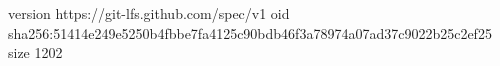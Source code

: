 version https://git-lfs.github.com/spec/v1
oid sha256:51414e249e5250b4fbbe7fa4125c90bdb46f3a78974a07ad37c9022b25c2ef25
size 1202
